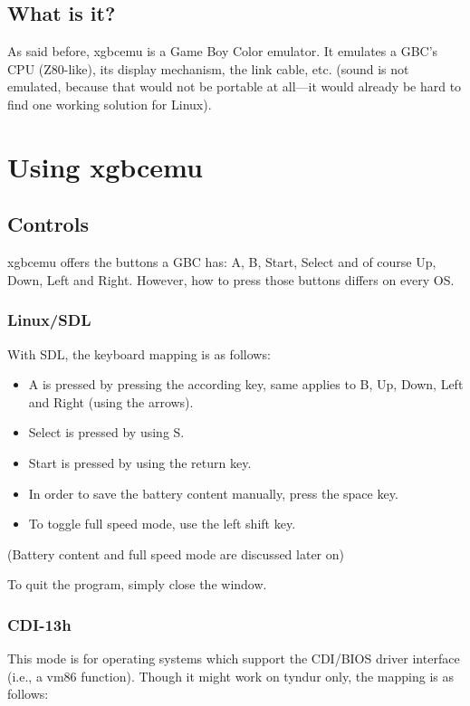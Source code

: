 \documentclass[fleqn,english,openany]{scrbook}
\begin{document}
\section{What is it?}

As said before, xgbcemu is a Game Boy Color emulator. It emulates a GBC's CPU (Z80-like), its display mechanism, the link
cable, etc. (sound is not emulated, because that would not be portable at all---it would already be hard to find one
working solution for Linux).



\chapter{Using xgbcemu}

\section{Controls}

xgbcemu offers the buttons a GBC has: A, B, Start, Select and of course Up, Down, Left and Right. However, how to press
those buttons differs on every OS.

\subsection{Linux/SDL}

With SDL, the keyboard mapping is as follows:

\begin{itemize}
\item A is pressed by pressing the according key, same applies to B, Up, Down, Left and Right (using the arrows).
\item Select is pressed by using S.
\item Start is pressed by using the return key.
\item In order to save the battery content manually, press the space key.
\item To toggle full speed mode, use the left shift key.
\end{itemize}
(Battery content and full speed mode are discussed later on)

To quit the program, simply close the window.

\subsection{CDI-13h}

This mode is for operating systems which support the CDI/BIOS driver interface (i.e., a vm86 function). Though it might
work on tyndur only, the mapping is as follows:
\end{document}
